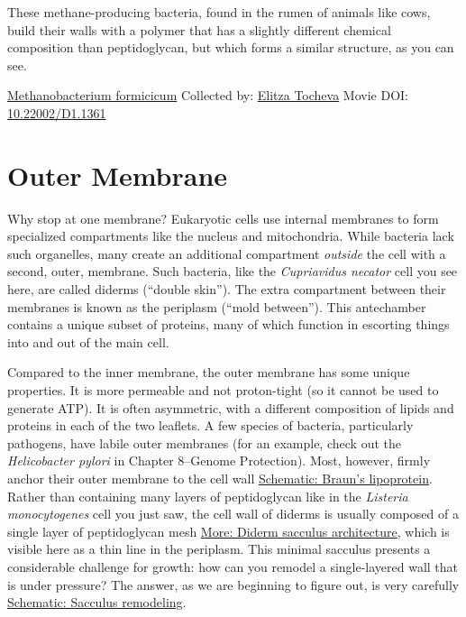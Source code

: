 \documentclass[]{tufte-book}
\begin{document}
These methane-producing bacteria, found in the rumen of animals like cows, build their walls with a polymer that has a slightly different chemical composition than peptidoglycan, but which forms a similar structure, as you can see.



\hypertarget{htmlwidget-f68ccff0e5993630d63d}{}

\label{fig:2-2b}\protect\hyperlink{tree}{Methanobacterium formicicum} Collected by: \protect\hyperlink{elitza_tocheva}{Elitza Tocheva} Movie DOI: \href{https://doi.org/10.22002/D1.1361}{10.22002/D1.1361}

\hypertarget{outer-membrane}{%
\section{Outer Membrane}\label{outer-membrane}}

Why stop at one membrane? Eukaryotic cells use internal membranes to form specialized compartments like the nucleus and mitochondria. While bacteria lack such organelles, many create an additional compartment \emph{outside} the cell with a second, outer, membrane. Such bacteria, like the \emph{Cupriavidus necator} cell you see here, are called diderms (``double skin''). The extra compartment between their membranes is known as the periplasm (``mold between''). This antechamber contains a unique subset of proteins, many of which function in escorting things into and out of the main cell.

Compared to the inner membrane, the outer membrane has some unique properties. It is more permeable and not proton-tight (so it cannot be used to generate ATP). It is often asymmetric, with a different composition of lipids and proteins in each of the two leaflets. A few species of bacteria, particularly pathogens, have labile outer membranes (for an example, check out the \emph{Helicobacter pylori} in Chapter 8--Genome Protection). Most, however, firmly anchor their outer membrane to the cell wall \protect\hyperlink{Brauns_lipoprotein}{Schematic: Braun's lipoprotein}. Rather than containing many layers of peptidoglycan like in the \emph{Listeria monocytogenes} cell you just saw, the cell wall of diderms is usually composed of a single layer of peptidoglycan mesh \protect\hyperlink{Diderm_sacculus_architecture}{More: Diderm sacculus architecture}, which is visible here as a thin line in the periplasm. This minimal sacculus presents a considerable challenge for growth: how can you remodel a single-layered wall that is under pressure? The answer, as we are beginning to figure out, is very carefully \protect\hyperlink{Sacculus_remodeling}{Schematic: Sacculus remodeling}.
\end{document}
